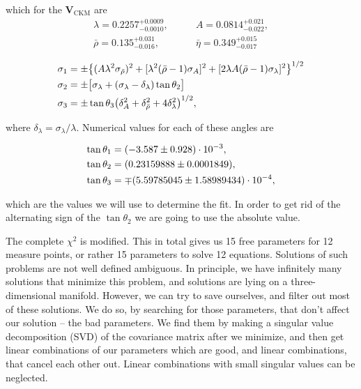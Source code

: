 \documentclass[12pt, a4paper]{article}
\renewcommand{\ni}{
	\noindent
}
\newcommand{\V}{
	\ensuremath{\mathbf{V}}
}
\begin{document}
\ni which for the $\V_\text{CKM}$ are
\begin{align}
	\lambda = 0.2257^{+0.0009}_{-0.0010}, &\qquad A = 0.0814^{+0.021}_{-0.022}, \\
	\bar{\rho} = 0.135^{+0.031}_{-0.016}, &\qquad \bar{\eta} = 0.349^{+0.015}_{-0.017}
\end{align}

\begin{align}
	\sigma_1 &= \pm\big\{(A\lambda^2 \sigma_{\bar{\rho}})^2 + [\lambda^2(\bar{\rho}-1)\sigma_A]^2 +
		[2\lambda A(\bar{\rho}-1)\sigma_\lambda]^2\big\}^{1/2} \notag \\
	\sigma_2 &= \pm\big[\sigma_\lambda + (\sigma_\lambda - \delta_\lambda)\tan\theta_2\big] \notag \\
	\sigma_3 &= \pm\tan\theta_3 \big(\delta_A^2 + \delta_{\bar{\rho}}^2 + 4\delta_\lambda^2\big)^{1/2},
\end{align}

\ni where $\delta_\lambda = \sigma_\lambda/\lambda$. Numerical values for each of these angles are

\begin{align}
	\tan\theta_1 &= (-3.587 \pm 0.928)\cdot10^{-3}, \notag \\
	\tan\theta_2 &= (0.23159888 \pm 0.0001849), \notag \\
	\tan\theta_3 &= \mp(5.59785045 \pm 1.58989434)\cdot 10^{-4},
\end{align}

\ni which are the values we will use to determine the fit. In order to get rid of the alternating sign of the $\tan\theta_2$
we are going to use the absolute value.

The complete $\chi^2$ is modified. This in total gives us 15 free parameters for 12 measure points, or rather 15 parameters
to solve 12 equations. Solutions of such problems are not well defined ambiguous. In principle, we have infinitely many
solutions that minimize this problem, and solutions are lying on a three-dimensional manifold. However, we can try to save
ourselves, and filter out most of these solutions. We do so, by searching for those parameters, that don't affect our solution
-- the bad parameters. We find them by making a singular value decomposition (SVD) of the covariance matrix after we minimize,
and then get linear combinations of our parameters which are good, and linear combinations, that cancel each other out. Linear
combinations with small singular values can be neglected.
\end{document}
